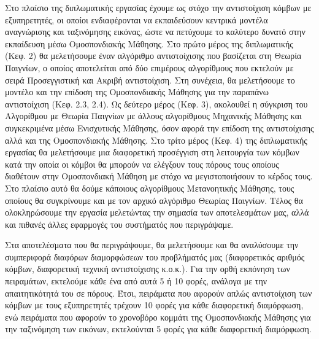 Στο πλαίσιο της διπλωματικής εργασίας έχουμε ως στόχο την αντιστοίχιση κόμβων με εξυπηρετητές, οι οποίοι ενδιαφέρονται να εκπαιδεύσουν κεντρικά μοντέλα αναγνώρισης και ταξινόμησης εικόνας, ώστε να πετύχουμε το καλύτερο δυνατό στην εκπαίδευση μέσω Ομοσπονδιακής Μάθησης. Στο πρώτο μέρος της διπλωματικής (Κεφ. 2) θα μελετήσουμε έναν αλγόριθμο αντιστοίχισης που βασίζεται στη Θεωρία Παιγνίων, ο οποίος αποτελείται από δύο επιμέρους αλγορίθμους που εκτελούν με σειρά Προσεγγιστική και Ακριβή αντιστοίχιση. Στη συνέχεια, θα μελετήσουμε το μοντέλο και την επίδοση της Ομοσπονδιακής Μάθησης για την παραπάνω αντιστοίχιση (Κεφ. 2.3, 2.4). Ως δεύτερο μέρος (Κεφ. 3), ακολουθεί η σύγκριση του Αλγορίθμου με Θεωρία Παιγνίων με άλλους αλγορίθμους Μηχανικής Μάθησης και συγκεκριμένα μέσω Ενισχυτικής Μάθησης, όσον αφορά την επίδοση της αντιστοίχισης αλλά και της Ομοσπονδιακής Μάθησης. Στο τρίτο μέρος (Κεφ. 4) της διπλωματικής εργασίας θα μελετήσουμε μια διαφορετική προσέγγιση στη λειτουργία των κόμβων κατά την οποία οι κόμβοι θα μπορούν να ελέγξουν τους πόρους τους οποίους διαθέτουν στην Ομοσπονδιακή Μάθηση με στόχο να μεγιστοποιήσουν το κέρδος τους. Στο πλαίσιο αυτό θα δούμε κάποιους αλγορίθμους Μετανοητικής Μάθησης, τους οποίους θα συγκρίνουμε και με τον αρχικό αλγόριθμο Θεωρίας Παιγνίων. Τέλος θα ολοκληρώσουμε την εργασία μελετώντας την σημασία των αποτελεσμάτων μας, αλλά και πιθανές άλλες εφαρμογές του συστήματός που περιγράψαμε.

Στα αποτελέσματα που θα περιγράψουμε, θα μελετήσουμε και θα αναλύσουμε την συμπεριφορά διαφόρων διαμορφώσεων του προβλήματός μας (διαφορετικός αριθμός κόμβων, διαφορετική τεχνική αντιστοίχισης κ.ο.κ.). Για την ορθή εκπόνηση των πειραμάτων, εκτελούμε κάθε ένα από αυτά 5 ή 10 φορές, ανάλογα με την απαιτητικότητά του σε πόρους. Έτσι, πειράματα που αφορούν απλώς αντιστοίχιση των κόμβων με τους εξυπηρετητές τρέχουν 10 φορές για κάθε διαφορετική διαμόρφωση, ενώ πειράματα που αφορούν το χρονοβόρο κομμάτι της Ομοσπονδιακής Μάθησης για την ταξινόμηση των εικόνων, εκτελούνται 5 φορές για κάθε διαφορετική διαμόρφωση.